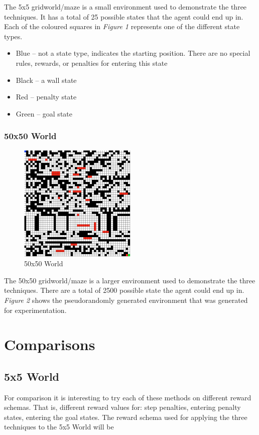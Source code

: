 \documentclass[a4paper,10pt]{article}
\begin{document}
The 5x5 gridworld/maze is a small environment used to demonstrate the three techniques. It has a total of 25 possible states that the agent could end up in. Each of the coloured squares in \textit{Figure 1} represents one of the different state types.

\begin{itemize}
\item Blue -- not a state type, indicates the starting position. There are no special rules, rewards, or penalties for entering this state
\item Black -- a wall state
\item Red -- penalty state
\item Green -- goal state
\end{itemize}

\subsubsection{50x50 World}
\begin{figure}[h!]
\centering
\includegraphics[width=0.5\textwidth]{figures/50by50_nopolicy.png}
\caption{50x50 World}
\end{figure}

The 50x50 gridworld/maze is a larger environment used to demonstrate the three techniques. There are a total of 2500 possible state the agent could end up in. \textit{Figure 2} shows the pseudorandomly generated environment that was generated for experimentation.

\section{Comparisons}
\subsection{5x5 World}
For comparison it is interesting to try each of these methods on different reward schemas. That is, different reward values for: step penalties, entering penalty states, entering the goal states. The reward schema used for applying the three techniques to the 5x5 World will be
\end{document}
